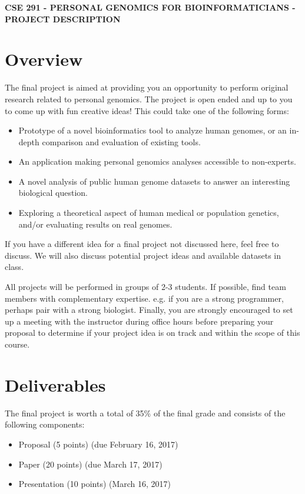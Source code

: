 \documentclass[12pt]{article}
\begin{document}
\textbf{CSE 291 - PERSONAL GENOMICS FOR BIOINFORMATICIANS - PROJECT DESCRIPTION}

\section*{Overview}
The final project is aimed at providing you an opportunity to perform original research related to personal genomics. The project is open ended and up to you to come up with fun creative ideas! This could take one of the following forms:

\begin{itemize}
\setlength\itemsep{0.0em}
\item Prototype of a novel bioinformatics tool to analyze human genomes, or an in-depth comparison and evaluation of existing tools.
\item An application making personal genomics analyses accessible to non-experts.
\item A novel analysis of public human genome datasets to answer an interesting biological question.
\item Exploring a theoretical aspect of human medical or population genetics, and/or evaluating results on real genomes.
\end{itemize}

If you have a different idea for a final project not discussed here, feel free to discuss. We will also discuss potential project ideas and available datasets in class.

All projects will be performed in groups of 2-3 students. If possible, find team members with complementary expertise. e.g. if you are a strong programmer, perhaps pair with a strong biologist. Finally, you are strongly encouraged to set up a meeting with the instructor during office hours before preparing your proposal to determine if your project idea is on track and within the scope of this course.

\section*{Deliverables}
The final project is worth a total of 35\% of the final grade and consists of the following components:

\begin{itemize}
\setlength\itemsep{0.0em}
\item Proposal (5 points) (due February 16, 2017)
\item Paper (20 points)  (due March 17, 2017)
\item Presentation (10 points) (March 16, 2017)
\end{itemize}
\end{document}
